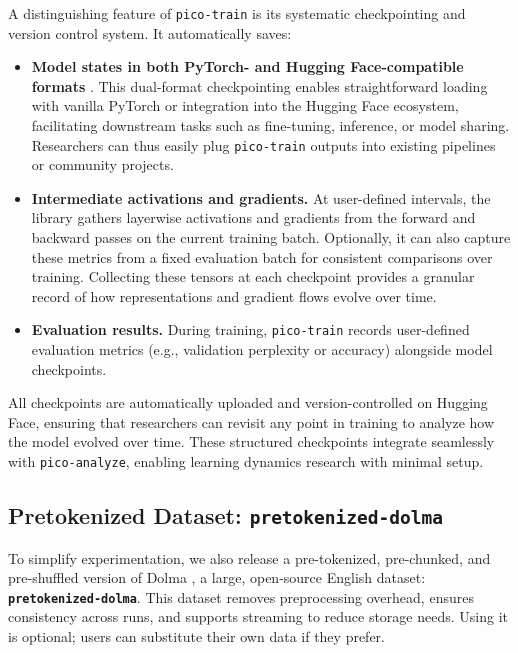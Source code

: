 A distinguishing feature of \texttt{pico-train} is its systematic checkpointing and version control system. It automatically saves:
\begin{itemize}
    \item \textbf{Model states in both PyTorch- and Hugging Face-compatible formats} \citep{huggingface}. This dual-format checkpointing enables straightforward loading with vanilla PyTorch or integration into the Hugging Face ecosystem, facilitating downstream tasks such as fine-tuning, inference, or model sharing. Researchers can thus easily plug \texttt{pico-train} outputs into existing pipelines or community projects.

    \item \textbf{Intermediate activations and gradients.} At user-defined intervals, the library gathers layerwise activations and gradients from the forward and backward passes on the current training batch. Optionally, it can also capture these metrics from a fixed evaluation batch for consistent comparisons over training. Collecting these tensors at each checkpoint provides a granular record of how representations and gradient flows evolve over time.

    \item \textbf{Evaluation results.} During training, \texttt{pico-train} records user-defined evaluation metrics (e.g., validation perplexity or accuracy) alongside model checkpoints.
\end{itemize}
\vspace{-0.2em}
All checkpoints are automatically uploaded and version-controlled on Hugging Face, ensuring that researchers can revisit any point in training to analyze how the model evolved over time. These structured checkpoints integrate seamlessly with \texttt{pico-analyze}, enabling learning dynamics research with minimal setup.

\subsection{Pretokenized Dataset: \texttt{pretokenized-dolma}}

To simplify experimentation, we also release a pre-tokenized, pre-chunked, and pre-shuffled version of Dolma \citep{soldaini2024dolma}, a large, open-source English dataset: \textbf{\texttt{pretokenized-dolma}}. This dataset removes preprocessing overhead, ensures consistency across runs, and supports streaming to reduce storage needs. Using it is optional; users can substitute their own data if they prefer. 

